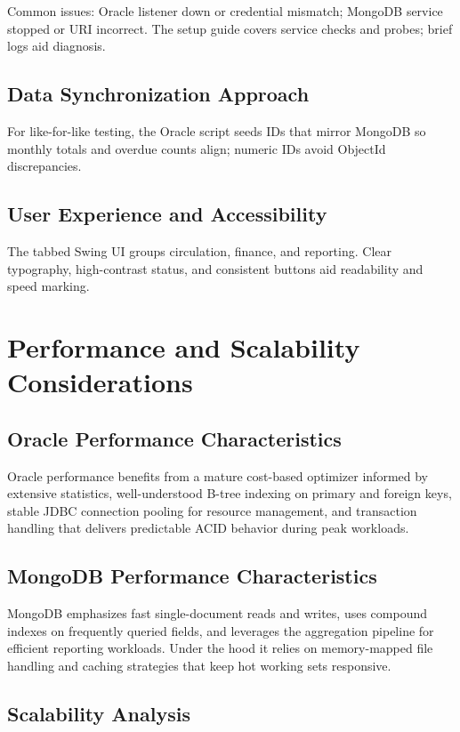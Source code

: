 \documentclass[12pt,a4paper]{article}
\begin{document}
Common issues: Oracle listener down or credential mismatch; MongoDB service stopped or URI incorrect. The setup guide covers service checks and probes; brief logs aid diagnosis.

\subsection{Data Synchronization Approach}

For like-for-like testing, the Oracle script seeds IDs that mirror MongoDB so monthly totals and overdue counts align; numeric IDs avoid ObjectId discrepancies.

\subsection{User Experience and Accessibility}

The tabbed Swing UI groups circulation, finance, and reporting. Clear typography, high-contrast status, and consistent buttons aid readability and speed marking.


\section{Performance and Scalability Considerations}

\subsection{Oracle Performance Characteristics}
Oracle performance benefits from a mature cost-based optimizer informed by extensive statistics, well-understood B-tree indexing on primary and foreign keys, stable JDBC connection pooling for resource management, and transaction handling that delivers predictable ACID behavior during peak workloads.

\subsection{MongoDB Performance Characteristics}
MongoDB emphasizes fast single-document reads and writes, uses compound indexes on frequently queried fields, and leverages the aggregation pipeline for efficient reporting workloads. Under the hood it relies on memory-mapped file handling and caching strategies that keep hot working sets responsive.

\subsection{Scalability Analysis}
\end{document}
